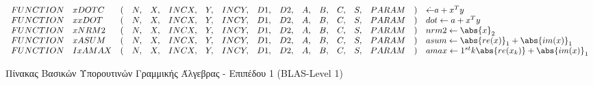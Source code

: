 \begin{figure}
\[{\begin{array}{lllllllllllllllll}
FUNCTION   & xDOTC  & ( & N, & X, & INCX, & Y, & INCY, & D1, & D2, & A, & B, & C, & S, & PARAM & ) & \dot \leftarrow a + x^Ty\\
FUNCTION   & xxDOT  & ( & N, & X, & INCX, & Y, & INCY, & D1, & D2, & A, & B, & C, & S, & PARAM & ) &  dot \leftarrow a + x^Ty\\
FUNCTION   & xNRM2  & ( & N, & X, & INCX, & Y, & INCY, & D1, & D2, & A, & B, & C, & S, & PARAM & ) & nrm2 \leftarrow \abs{x}_2\\
FUNCTION   & xASUM  & ( & N, & X, & INCX, & Y, & INCY, & D1, & D2, & A, & B, & C, & S, & PARAM & ) & asum \leftarrow \abs{re(x)}_1 + \abs{im(x)}_1\\
FUNCTION   & IxAMAX & ( & N, & X, & INCX, & Y, & INCY, & D1, & D2, & A, & B, & C, & S, & PARAM & ) & amax \leftarrow 1^{st}k \abs{re(x_k)} + \abs{im(x)}_1\\
\end{array}
}
\]
    \caption{Πίνακας Βασικών Υπορουτινών Γραμμικής Άλγεβρας - Επιπέδου 1 (BLAS-Level 1)}
    \label{fig:my_label}
\end{figure}


